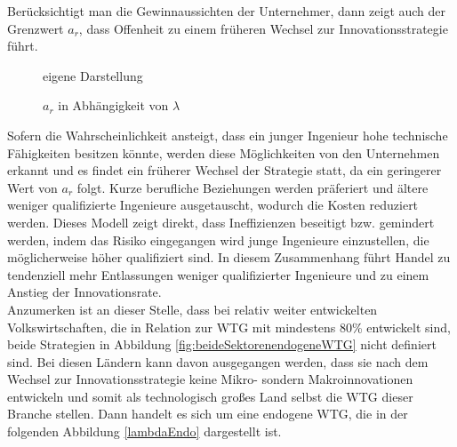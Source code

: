 Berücksichtigt man die Gewinnaussichten der Unternehmer, dann zeigt auch der Grenzwert $a_r$, dass Offenheit zu einem früheren Wechsel zur Innovationsstrategie führt. \\
%
	\begin{figure*}[h]
%			
		\hfill{}  eigene Darstellung
		\caption{$a_r$ in Abhängigkeit von $\lambda$ }
		\label{fig:VerhaltenAR}
	\end{figure*}
%
Sofern die Wahrscheinlichkeit ansteigt, dass ein junger Ingenieur hohe technische Fähigkeiten besitzen könnte, werden diese Möglichkeiten von den Unternehmen erkannt und es findet ein früherer Wechsel der Strategie statt, da ein geringerer Wert von $a_r$ folgt. Kurze berufliche Beziehungen werden präferiert und ältere  weniger qualifizierte Ingenieure ausgetauscht, wodurch die Kosten reduziert werden. Dieses Modell zeigt direkt, dass Ineffizienzen beseitigt bzw. gemindert werden, indem das Risiko eingegangen wird junge Ingenieure einzustellen, die möglicherweise höher qualifiziert sind.
In diesem Zusammenhang führt Handel zu tendenziell mehr Entlassungen weniger qualifizierter Ingenieure und zu einem Anstieg der Innovationsrate.\\
Anzumerken ist an dieser Stelle, dass bei relativ weiter entwickelten Volkswirtschaften, die in Relation zur WTG mit mindestens 80\% entwickelt sind, beide Strategien in Abbildung \ref{fig:beideSektorenendogeneWTG} nicht definiert sind. Bei diesen Ländern kann davon ausgegangen werden, dass sie nach dem Wechsel zur Innovationsstrategie keine Mikro- sondern Makroinnovationen entwickeln und somit als technologisch großes Land selbst die WTG dieser Branche stellen. Dann handelt es sich um eine endogene WTG, die in der folgenden Abbildung \ref{lambdaEndo} dargestellt ist.\\

